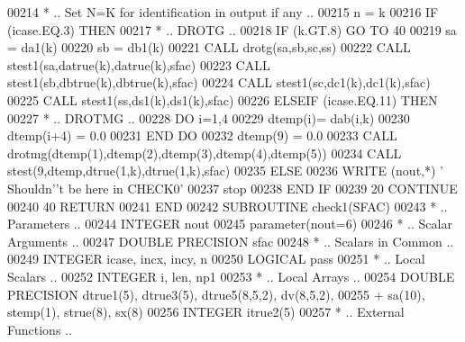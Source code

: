 \begin{DoxyCode}
00214 \textcolor{comment}{*        .. Set N=K for identification in output if any ..}
00215          n = k
00216          \textcolor{keywordflow}{IF} (icase.EQ.3) \textcolor{keywordflow}{THEN}
00217 \textcolor{comment}{*           .. DROTG ..}
00218             \textcolor{keywordflow}{IF} (k.GT.8) \textcolor{keywordflow}{GO TO} 40
00219             sa = da1(k)
00220             sb = db1(k)
00221             \textcolor{keyword}{CALL }drotg(sa,sb,sc,ss)
00222             \textcolor{keyword}{CALL }stest1(sa,datrue(k),datrue(k),sfac)
00223             \textcolor{keyword}{CALL }stest1(sb,dbtrue(k),dbtrue(k),sfac)
00224             \textcolor{keyword}{CALL }stest1(sc,dc1(k),dc1(k),sfac)
00225             \textcolor{keyword}{CALL }stest1(ss,ds1(k),ds1(k),sfac)
00226          \textcolor{keywordflow}{ELSEIF} (icase.EQ.11) \textcolor{keywordflow}{THEN}
00227 \textcolor{comment}{*           .. DROTMG ..}
00228             \textcolor{keywordflow}{DO} i=1,4
00229                dtemp(i)= dab(i,k)
00230                dtemp(i+4) = 0.0
00231 \textcolor{keywordflow}{            END DO}
00232             dtemp(9) = 0.0
00233             \textcolor{keyword}{CALL }drotmg(dtemp(1),dtemp(2),dtemp(3),dtemp(4),dtemp(5))
00234             \textcolor{keyword}{CALL }stest(9,dtemp,dtrue(1,k),dtrue(1,k),sfac)
00235          \textcolor{keywordflow}{ELSE}
00236             \textcolor{keyword}{WRITE} (nout,*) \textcolor{stringliteral}{' Shouldn'}\textcolor{stringliteral}{'t be here in CHECK0'}
00237             stop
00238 \textcolor{keywordflow}{         END IF}
00239    20 \textcolor{keywordflow}{CONTINUE}
00240    40 \textcolor{keywordflow}{RETURN}
00241 \textcolor{keyword}{      END}
00242 \textcolor{keyword}{      SUBROUTINE }check1(SFAC)
00243 \textcolor{comment}{*     .. Parameters ..}
00244       \textcolor{keywordtype}{INTEGER}           nout
00245       parameter(nout=6)
00246 \textcolor{comment}{*     .. Scalar Arguments ..}
00247       \textcolor{keywordtype}{DOUBLE PRECISION}  sfac
00248 \textcolor{comment}{*     .. Scalars in Common ..}
00249       \textcolor{keywordtype}{INTEGER}           icase, incx, incy, n
00250       \textcolor{keywordtype}{LOGICAL}           pass
00251 \textcolor{comment}{*     .. Local Scalars ..}
00252       \textcolor{keywordtype}{INTEGER}           i, len, np1
00253 \textcolor{comment}{*     .. Local Arrays ..}
00254       \textcolor{keywordtype}{DOUBLE PRECISION}  dtrue1(5), dtrue3(5), dtrue5(8,5,2), dv(8,5,2),
00255      +                  sa(10), stemp(1), strue(8), sx(8)
00256       \textcolor{keywordtype}{INTEGER}           itrue2(5)
00257 \textcolor{comment}{*     .. External Functions ..}

\end{DoxyCode}
